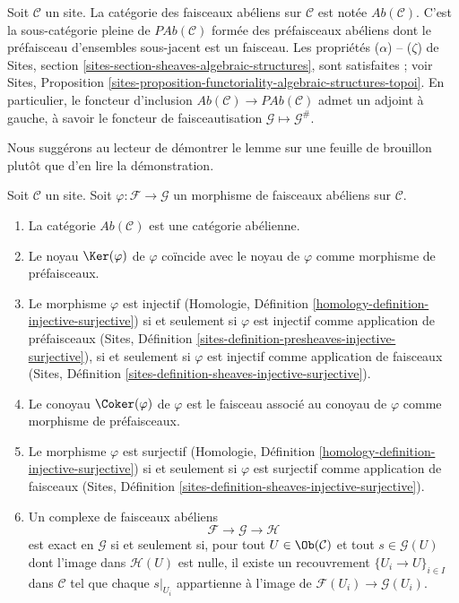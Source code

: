 \noindent
Soit $\mathcal{C}$ un site. La catégorie des faisceaux abéliens sur
$\mathcal{C}$ est notée $\textit{Ab}(\mathcal{C})$. C'est la sous-catégorie
pleine de $\textit{PAb}(\mathcal{C})$ formée des préfaisceaux abéliens dont le
préfaisceau d'ensembles sous-jacent est un faisceau. Les propriétés
($\alpha$) -- ($\zeta$) de Sites, section
\ref{sites-section-sheaves-algebraic-structures}, sont satisfaites ; voir
Sites, Proposition
\ref{sites-proposition-functoriality-algebraic-structures-topoi}. En
particulier, le foncteur d'inclusion
$\textit{Ab}(\mathcal{C}) \to \textit{PAb}(\mathcal{C})$ admet un adjoint à
gauche, à savoir le foncteur de faisceautisation
$\mathcal{G} \mapsto \mathcal{G}^\#$.

\medskip\noindent
Nous suggérons au lecteur de démontrer le lemme sur une feuille de brouillon
plutôt que d'en lire la démonstration.

\begin{lemma}
\label{lemma-abelian-abelian}
Soit $\mathcal{C}$ un site. Soit $\varphi : \mathcal{F} \to \mathcal{G}$
un morphisme de faisceaux abéliens sur $\mathcal{C}$.
\begin{enumerate}
\item La catégorie $\textit{Ab}(\mathcal{C})$ est une catégorie abélienne.
\item Le noyau $\Ker(\varphi)$ de $\varphi$ coïncide avec le noyau de
$\varphi$ comme morphisme de préfaisceaux.
\item Le morphisme $\varphi$ est injectif (Homologie, Définition
\ref{homology-definition-injective-surjective}) si et seulement si $\varphi$ est
injectif comme application de préfaisceaux (Sites, Définition
\ref{sites-definition-presheaves-injective-surjective}), si et seulement si
$\varphi$ est injectif comme application de faisceaux (Sites, Définition
\ref{sites-definition-sheaves-injective-surjective}).
\item Le conoyau $\Coker(\varphi)$ de $\varphi$ est le faisceau associé au
conoyau de $\varphi$ comme morphisme de préfaisceaux.
\item Le morphisme $\varphi$ est surjectif (Homologie, Définition
\ref{homology-definition-injective-surjective}) si et seulement si $\varphi$ est
surjectif comme application de faisceaux (Sites, Définition
\ref{sites-definition-sheaves-injective-surjective}).
\item Un complexe de faisceaux abéliens
$$
\mathcal{F} \to \mathcal{G} \to \mathcal{H}
$$
est exact en $\mathcal{G}$ si et seulement si, pour tout
$U \in \Ob(\mathcal{C})$ et tout $s \in \mathcal{G}(U)$ dont l'image dans
$\mathcal{H}(U)$ est nulle, il existe un recouvrement
$\{U_i \to U\}_{i \in I}$ dans $\mathcal{C}$ tel que chaque $s|_{U_i}$
appartienne à l'image de $\mathcal{F}(U_i) \to \mathcal{G}(U_i)$.
\end{enumerate}
\end{lemma}

